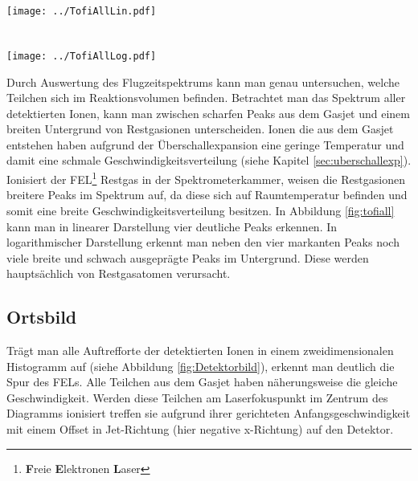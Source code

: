 \begin{center}
\begin{minipage}{\linewidth}
\centering
\texttt{[image: ../TofiAllLin.pdf]} \\ ~\\~ \\
\texttt{[image: ../TofiAllLog.pdf]}%
 \label{fig:tofiall}
\end{minipage} 
\end{center} 
Durch Auswertung des Flugzeitspektrums kann man genau untersuchen, welche Teilchen sich im Reaktionsvolumen befinden. Betrachtet man das Spektrum aller detektierten Ionen, kann man zwischen scharfen Peaks aus dem Gasjet und einem breiten Untergrund von Restgasionen unterscheiden. Ionen die aus dem Gasjet entstehen haben aufgrund der Überschallexpansion eine geringe Temperatur und damit eine schmale Geschwindigkeitsverteilung (siehe Kapitel \ref{sec:uberschallexp}). Ionisiert der FEL\footnote{\textbf{F}reie \textbf{E}lektronen \textbf{L}aser} Restgas in der Spektrometerkammer, weisen die Restgasionen breitere Peaks im Spektrum auf, da diese sich auf Raumtemperatur befinden und somit eine breite Geschwindigkeitsverteilung besitzen. In Abbildung \ref{fig:tofiall} kann man in linearer Darstellung vier deutliche Peaks erkennen. In logarithmischer Darstellung erkennt man neben den vier markanten Peaks noch viele breite und schwach ausgeprägte Peaks im Untergrund. Diese werden hauptsächlich von Restgasatomen verursacht.
\subsection{Ortsbild}

Trägt man alle Auftrefforte der detektierten Ionen in einem zweidimensionalen Histogramm auf (siehe Abbildung \ref{fig:Detektorbild}), erkennt man deutlich die Spur des FELs. Alle Teilchen aus dem Gasjet haben näherungsweise die gleiche Geschwindigkeit. Werden diese Teilchen am Laserfokuspunkt im Zentrum des Diagramms ionisiert treffen sie aufgrund ihrer gerichteten Anfangsgeschwindigkeit mit einem Offset in Jet-Richtung (hier negative x-Richtung) auf den Detektor. \\ \newpage


